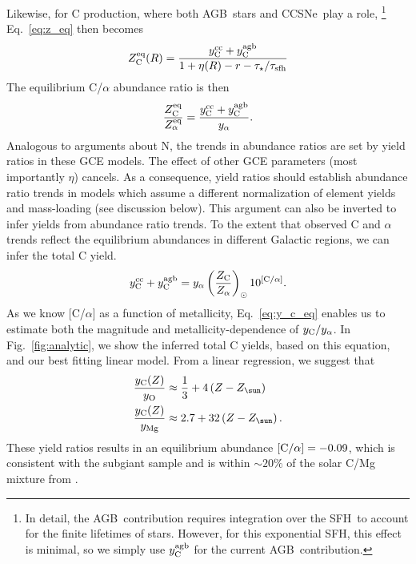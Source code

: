 \documentclass[fleqn,usenatbib]{mnras}
\newcommand{\agb}{AGB}
\newcommand{\cc}{CCSNe}
\newcommand{\gce}{GCE}
\newcommand{\sfh}{SFH} %
\newcommand{\Yct}{\ensuremath{y_{\rm C}}}
\newcommand{\Ycc}{\ensuremath{y_{\rm C}^{\rm cc}}}
\newcommand{\Ycagb}{\ensuremath{y_{\rm C}^{\rm agb}}}
\newcommand{\Zo}{%
    \ifmmode Z_{\sun}%
    \else $Z_{\sun}$%
    \fi}
\newcommand{\about}[1]{${\sim} #1$}
\begin{document}
Likewise, for C production, where both \agb\ stars and \cc\ play a role,%
\footnote{In detail, the \agb\ contribution requires integration over the \sfh\ to account for the finite lifetimes of stars. However, for this exponential \sfh, this effect is minimal, so we simply use $\Ycagb$ for the current \agb\ contribution.}
Eq.~\ref{eq:z_eq} then becomes
\begin{equation}
    Z_{\rm C}^{\rm eq}(R) = \frac{\Ycc + \Ycagb}{1 + \eta(R) - r - \tau_\star / \tau_{\rm sfh}}
\end{equation}
The equilibrium C/$\alpha$ abundance ratio is then
\begin{equation}\label{eq:z_co}
    \frac{Z_{\rm C}^{\rm eq}}{Z_\alpha^{\rm eq}} = \frac{\Ycc + \Ycagb }{y_\alpha}.
\end{equation}
Analogous to \cite{james+23} arguments about N, the trends in abundance ratios are set by yield ratios in these \gce{} models. The effect of other \gce{} parameters (most importantly $\eta$) cancels. As a consequence, yield ratios should establish abundance ratio trends in models which assume a different normalization of element yields and mass-loading (see discussion below).
This argument can also be inverted to infer  yields from abundance ratio trends. To the extent that observed C and $\alpha$ trends reflect the equilibrium abundances in different Galactic regions, we can infer the total C yield.
\begin{equation}\label{eq:y_c_eq}
    \Ycc + \Ycagb =  y_\alpha \left(\frac{Z_{\rm C}}{Z_{\alpha}}\right)_\odot 10^{[{\rm C}/\alpha]}.
\end{equation}
As we know [C/$\alpha$] as a function of metallicity, Eq.~\ref{eq:y_c_eq} enables us to estimate both the magnitude and metallicity-dependence of $\Yct/y_\alpha$.
In Fig.~\ref{fig:analytic}, we show the inferred total C yields, based on this equation, and our best fitting linear model. From a linear regression, we suggest that
\begin{subequations}\label{eq:yc_inferred}
    \begin{align}
        \frac{\Yct(Z)}{y_{\rm O}} &\approx \frac{1}{3} + 4 \left(Z-\Zo\right) \\
        \frac{\Yct(Z)}{y_{\rm Mg}} &\approx 2.7 + 32 \left(Z-\Zo\right).
    \end{align}
\end{subequations}
These yield ratios results in an equilibrium abundance $[{\rm C}/\alpha] = -0.09$, which is consistent with the subgiant sample and is within \about{20\%} of the solar C/Mg mixture from \citet{asplund+09}.
\end{document}
